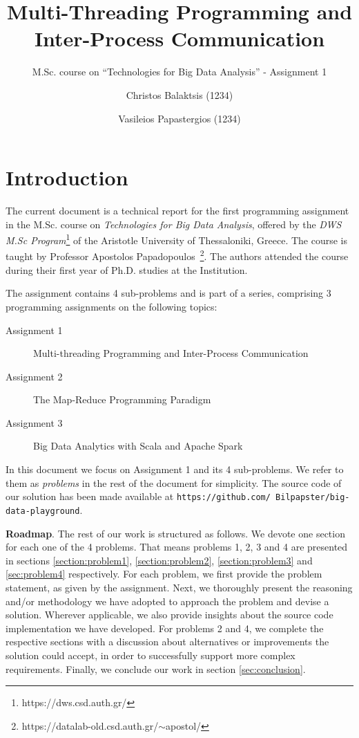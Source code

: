 \documentclass[acmlarge]{acmart}
\begin{document}
\title{Multi-Threading Programming and Inter-Process Communication}
\subtitle{M.Sc. course on ``Technologies for Big Data Analysis'' - Assignment 1}

\author{Christos Balaktsis (1234)}
\author{Vasileios Papastergios (1234)}

\renewcommand{\shortauthors}{C. Balaktsis and V. Papastergios}
\maketitle

\section{Introduction}

The current document is a technical report for the first programming assignment in the M.Sc. course on \emph{Technologies for Big Data Analysis}, offered by the \emph{DWS M.Sc Program}\footnote{https://dws.csd.auth.gr/} of the Aristotle University of Thessaloniki, Greece. The course is taught by Professor Apostolos Papadopoulos~\footnote{https://datalab-old.csd.auth.gr/$\sim$apostol/}. The authors attended the course during their first year of Ph.D. studies at the Institution.

The assignment contains 4 sub-problems and is part of a series, comprising 3 programming assignments on the following topics:
\begin{description}
  \item[Assignment 1] Multi-threading Programming and Inter-Process Communication
  \item[Assignment 2] The Map-Reduce Programming Paradigm
  \item[Assignment 3] Big Data Analytics with Scala and Apache Spark
\end{description}
In this document we focus on Assignment 1 and its 4 sub-problems. We refer to them as \emph{problems} in the rest of the document for simplicity. The source code of our solution has been made available at \texttt{\small https://github.com/ Bilpapster/big-data-playground}.

\textbf{Roadmap}.
The rest of our work is structured as follows. We devote one section for each one of the 4 problems. That means problems 1, 2, 3 and 4 are presented in sections \ref{section:problem1}, \ref{section:problem2}, \ref{section:problem3} and \ref{sec:problem4} respectively. For each problem, we first provide the problem statement, as given by the assignment. Next, we thoroughly present the reasoning and/or methodology we have adopted to approach the problem and devise a solution. Wherever applicable, we also provide insights about the source code implementation we have developed. For problems 2 and 4, we complete the respective sections with a discussion about alternatives or improvements the solution could accept, in order to successfully support more complex requirements. Finally, we conclude our work in section \ref{sec:conclusion}.
\end{document}
